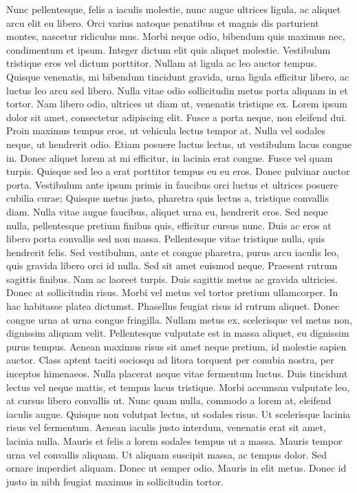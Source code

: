 Nunc pellentesque, felis a iaculis molestie, nunc augue ultrices ligula, ac aliquet arcu elit eu libero. Orci varius natoque penatibus et magnis dis parturient montes, nascetur ridiculus mus. Morbi neque odio, bibendum quis maximus nec, condimentum et ipsum. Integer dictum elit quis aliquet molestie. Vestibulum tristique eros vel dictum porttitor. Nullam at ligula ac leo auctor tempus. Quisque venenatis, mi bibendum tincidunt gravida, urna ligula efficitur libero, ac luctus leo arcu sed libero. Nulla vitae odio sollicitudin metus porta aliquam in et tortor. Nam libero odio, ultrices ut diam ut, venenatis tristique ex.
Lorem ipsum dolor sit amet, consectetur adipiscing elit. Fusce a porta neque, non eleifend dui. Proin maximus tempus eros, ut vehicula lectus tempor at. Nulla vel sodales neque, ut hendrerit odio. Etiam posuere luctus lectus, ut vestibulum lacus congue in. Donec aliquet lorem at mi efficitur, in lacinia erat congue. Fusce vel quam turpis. Quisque sed leo a erat porttitor tempus eu eu eros. Donec pulvinar auctor porta. Vestibulum ante ipsum primis in faucibus orci luctus et ultrices posuere cubilia curae;
Quisque metus justo, pharetra quis lectus a, tristique convallis diam. Nulla vitae augue faucibus, aliquet urna eu, hendrerit eros. Sed neque nulla, pellentesque pretium finibus quis, efficitur cursus nunc. Duis ac eros at libero porta convallis sed non massa. Pellentesque vitae tristique nulla, quis hendrerit felis. Sed vestibulum, ante et congue pharetra, purus arcu iaculis leo, quis gravida libero orci id nulla. Sed sit amet euismod neque. Praesent rutrum sagittis finibus. Nam ac laoreet turpis. Duis sagittis metus ac gravida ultricies. Donec at sollicitudin risus. Morbi vel metus vel tortor pretium ullamcorper. In hac habitasse platea dictumst. Phasellus feugiat risus id rutrum aliquet. Donec congue urna at urna congue fringilla. Nullam metus ex, scelerisque vel metus non, dignissim aliquam velit.
Pellentesque vulputate est in massa aliquet, eu dignissim purus tempus. Aenean maximus risus sit amet neque pretium, id molestie sapien auctor. Class aptent taciti sociosqu ad litora torquent per conubia nostra, per inceptos himenaeos. Nulla placerat neque vitae fermentum luctus. Duis tincidunt lectus vel neque mattis, et tempus lacus tristique. Morbi accumsan vulputate leo, at cursus libero convallis ut. Nunc quam nulla, commodo a lorem at, eleifend iaculis augue. Quisque non volutpat lectus, ut sodales risus. Ut scelerisque lacinia risus vel fermentum.
Aenean iaculis justo interdum, venenatis erat sit amet, lacinia nulla. Mauris et felis a lorem sodales tempus ut a massa. Mauris tempor urna vel convallis aliquam. Ut aliquam suscipit massa, ac tempus dolor. Sed ornare imperdiet aliquam. Donec ut semper odio. Mauris in elit metus. Donec id justo in nibh feugiat maximus in sollicitudin tortor.
